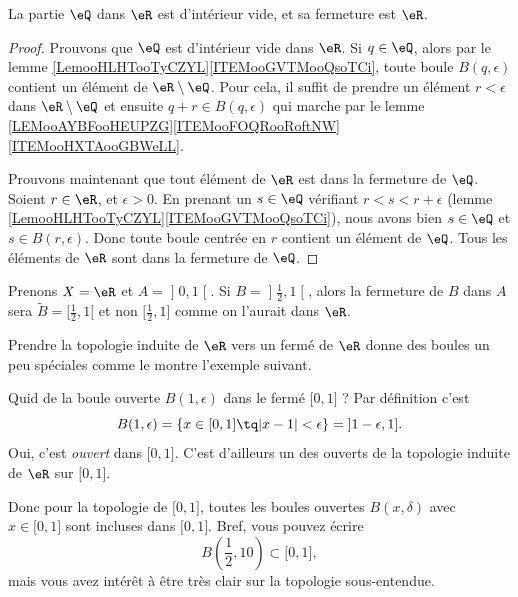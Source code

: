 \begin{lemma}       \label{LEMooIGQCooOrroHT}
	La partie \( \eQ\) dans \( \eR\) est d'intérieur vide, et sa fermeture est \( \eR\).
\end{lemma}

\begin{proof}
	Prouvons que \( \eQ\) est d'intérieur vide dans \( \eR\). Si \( q\in \eQ\), alors par le lemme \ref{LemooHLHTooTyCZYL}\ref{ITEMooGVTMooQsoTCi}, toute boule \( B(q,\epsilon)\) contient un élément de \(\eR\setminus \eQ \). Pour cela, il suffit de prendre un élément \( r<\epsilon\) dans \( \eR\setminus \eQ\) et ensuite \( q+r\in B(q,\epsilon)\) qui marche par le lemme \ref{LEMooAYBFooHEUPZG}\ref{ITEMooFOQRooRoftNW}\ref{ITEMooHXTAooGBWeLL}.

	Prouvons maintenant que tout élément de \( \eR\) est dans la fermeture de \( \eQ\). Soient \( r\in \eR\), et \( \epsilon>0\). En prenant un \( s\in \eQ\) vérifiant \( r<s<r+\epsilon\) (lemme \ref{LemooHLHTooTyCZYL}\ref{ITEMooGVTMooQsoTCi}), nous avons bien \( s\in \eQ\) et \( s\in B(r,\epsilon)\). Donc toute boule centrée en \( r\) contient un élément de \( \eQ\). Tous les éléments de \( \eR\) sont dans la fermeture de \( \eQ\).
\end{proof}

\begin{example} \label{ExloeyoR}
	Prenons \( X=\eR\) et \( A=\mathopen] 0 , 1 \mathclose[\). Si \( B=\mathopen] \frac{ 1 }{2} , 1 \mathclose[ \), alors la fermeture de \( B\) dans \( A\) sera \( \tilde B=\mathopen[ \frac{ 1 }{2} , 1 [\) et non \( \mathopen[ \frac{ 1 }{2} , 1 \mathclose]\) comme on l'aurait dans \( \eR\).
\end{example}

Prendre la topologie induite de \( \eR\) vers un fermé de \( \eR\) donne des boules un peu spéciales comme le montre l'exemple suivant.

\begin{example}  \label{ExKYZwYxn}
	Quid de la boule ouverte \( B(1,\epsilon)\) dans le fermé \( \mathopen[ 0 , 1 \mathclose]\) ? Par définition c'est
	\begin{equation}
		B(1,\epsilon)=\{ x\in\mathopen[ 0 , 1 \mathclose]\tq | x-1 |<\epsilon \}=\mathopen] 1-\epsilon , 1 \mathclose].
	\end{equation}
	Oui, c'est \emph{ouvert} dans \( \mathopen[ 0 , 1 \mathclose]\). C'est d'ailleurs un des ouverts de la topologie induite de \( \eR\) sur \( \mathopen[ 0 , 1 \mathclose]\).

	Donc pour la topologie de \( \mathopen[ 0 , 1 \mathclose]\), toutes les boules ouvertes \( B(x,\delta)\) avec \( x\in\mathopen[ 0 , 1 \mathclose]\) sont incluses dans \( \mathopen[ 0 , 1 \mathclose]\). Bref, vous pouvez écrire
	\begin{equation}
		B(\frac{ 1 }{2}, 10)\subset \mathopen[ 0 , 1 \mathclose],
	\end{equation}
	mais vous avez intérêt à être très clair sur la topologie sous-entendue.
\end{example}


